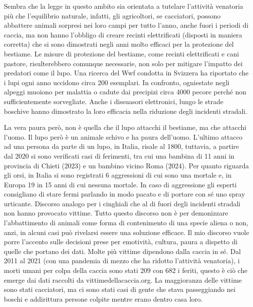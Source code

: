 \documentclass[12pt]{book} %
\begin{document}
\begin{mdframed}[linewidth=1pt]
Sembra che la legge in questo ambito sia orientata a tutelare l'attività venatoria più che l'equilibrio naturale, infatti, gli agricoltori, se cacciatori, possono abbattere animali sorpresi nei loro campi per tutto l'anno, anche fuori i periodi di caccia, ma non hanno l'obbligo di creare recinti elettrificati (disposti in maniera corretta) che si sono dimostrati negli anni molto efficaci per la protezione del bestiame. Le misure di protezione del bestiame, come recinti elettrificati e cani pastore, risulterebbero comunque necessarie, non solo per mitigare l'impatto dei predatori come il lupo. Una ricerca del Wwf condotta in Svizzera ha riportato che i lupi ogni anno uccidono circa 200 esemplari. In confronto, ogniestate negli alpeggi muoiono per malattia o cadute dai precipizi circa 4000 pecore perché non sufficientemente sorvegliate. Anche i dissuasori elettronici, lungo le strade boschive hanno dimostrato la loro efficacia nella riduzione degli incidenti stradali.

La vera paura però, non è quella che il lupo attacchi il bestiame, ma che attacchi l'uomo. Il lupo però è un animale schivo e ha paura dell'uomo. L'ultimo attacco ad una persona da parte di un lupo, in Italia, risale al 1800, tuttavia, a partire dal 2020 si sono verificati casi di ferimenti, tra cui una bambina di 11 anni in provincia di Chieti (2023) e un bambino vicino Roma (2024).
Per quanto riguarda gli orsi, in Italia si sono registrati 6 aggressioni di cui sono una mortale e, in Europa 19 in 15 anni di cui nessuna mortale. In caso di aggressione gli esperti consigliano di stare fermi parlando in modo pacato e di portare con sé uno spray urticante. Discorso analogo per i cinghiali che al di fuori degli incidenti stradali non hanno provocato vittime.
Tutto questo discorso non è per demonizzare l'abbattimento di animali come forma di contenimento di una specie aliena o non, anzi, in alcuni casi può rivelarsi essere una soluzione efficace. Il mio discorso vuole porre l'accento sulle decisioni prese per emotività, cultura, paura a dispetto di quelle che portano dei dati.
Molte più vittime dipendono dalla caccia in sé. Dal 2011 al 2021
(con una pandemia di mezzo che ha ridotto l'attività venatoria), i morti umani per colpa della caccia sono stati 209 con 682 i feriti, questo è ciò che emerge dai dati raccolti da vittimedellacaccia.org. La maggioranza delle vittime sono stati cacciatori, ma ci sono stati casi di gente che stava passeggiando nei boschi e
addirittura persone colpite mentre erano dentro casa loro. 
\end{mdframed}
\end{document}
